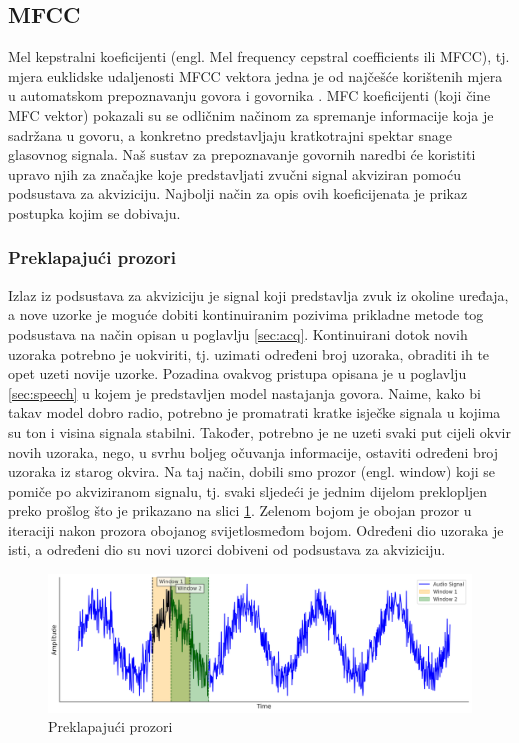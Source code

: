 \subsection{MFCC}
\label{MFCCconstruction}
Mel kepstralni koeficijenti (engl. Mel frequency cepstral coefficients ili MFCC), tj. mjera 
euklidske udaljenosti MFCC vektora jedna je od najčešće korištenih mjera u automatskom 
prepoznavanju govora i govornika \cite{vasilijevic2011perceptual}. 
MFC koeficijenti (koji čine MFC vektor) pokazali su se odličnim načinom za spremanje informacije
koja je sadržana u govoru, a konkretno predstavljaju kratkotrajni spektar snage glasovnog 
signala. Naš sustav za prepoznavanje govornih naredbi će koristiti upravo njih za 
značajke koje predstavljati zvučni signal akviziran pomoću podsustava za akviziciju. 
Najbolji način za opis ovih koeficijenata je prikaz postupka kojim se dobivaju.


\subsubsection{Preklapajući prozori}
\label{sec:win}
Izlaz iz podsustava za akviziciju je signal koji predstavlja zvuk iz okoline uređaja, 
a nove uzorke je moguće dobiti kontinuiranim pozivima prikladne metode tog podsustava
na način opisan u poglavlju \ref{sec:acq}. Kontinuirani dotok novih uzoraka potrebno 
je uokviriti, tj. uzimati određeni broj uzoraka, obraditi ih te opet uzeti novije uzorke. 
Pozadina ovakvog pristupa opisana je u poglavlju \ref{sec:speech} u kojem je predstavljen
model nastajanja govora. Naime, kako bi takav model dobro radio, potrebno je promatrati
kratke isječke signala u kojima su ton i visina signala stabilni. Također, potrebno je
ne uzeti svaki put cijeli okvir novih uzoraka, nego, u svrhu boljeg očuvanja informacije,
ostaviti određeni broj uzoraka iz starog okvira. Na taj način, dobili smo prozor (engl. window)
koji se pomiče po akviziranom signalu, tj. svaki sljedeći je jednim dijelom preklopljen
preko prošlog što je prikazano na slici \ref{pic:sliding}. Zelenom bojom je obojan prozor
u iteraciji nakon prozora obojanog svijetlosmeđom bojom. Određeni dio uzoraka je isti,
a određeni dio su novi uzorci dobiveni od podsustava za akviziciju.

\begin{figure}[htb]
    \centering
    \includegraphics[width=1\linewidth]{Chapters/struktura_sustava/generiranje_znacajki/sliding.png} 
    \caption{Preklapajući prozori}
    \label{pic:sliding}
\end{figure}

